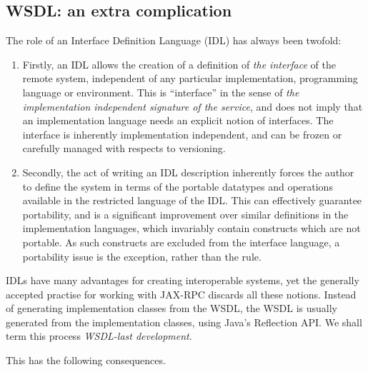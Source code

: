\subsection{WSDL: an extra complication}
\label{objections:wsdl-gen}

The role of an Interface Definition Language (IDL) has always been
twofold:

\begin{enumerate}
\item Firstly, an IDL allows the creation of a definition of \emph{the
interface} of the remote system, independent of any particular
implementation, programming language or environment. This is
``interface'' in the sense of \emph{the implementation independent
signature of the service}, and does not imply that an implementation
language needs an explicit notion of interfaces. The interface is
inherently implementation independent, and can be frozen or carefully
managed with respects to versioning.

\item Secondly, the act of writing an IDL description inherently
forces the author to define the system in terms of the portable
datatypes and operations available in the restricted language of the
IDL.  This can effectively guarantee portability, and is a significant
improvement over similar definitions in the implementation languages,
which invariably contain constructs which are not portable. As such
constructs are excluded from the interface language, a portability
issue is the exception, rather than the rule.
\end{enumerate}

IDLs have many advantages for creating interoperable systems, yet the
generally accepted practise for working with JAX-RPC discards all
these notions. Instead of generating implementation classes from the
WSDL, the WSDL is usually generated from the implementation classes,
using Java's Reflection API. We shall term this process
\emph{WSDL-last development}.

This has the following consequences.

